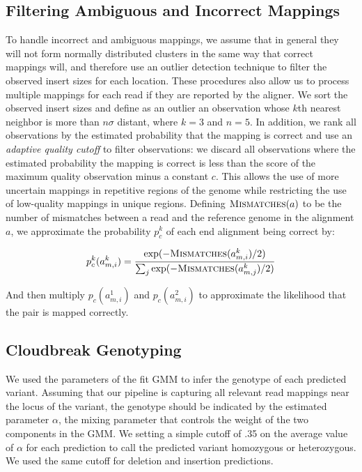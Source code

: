\documentclass[10pt]{bmc_article}
\newenvironment{bmcformat}{\fussy\setboolean{publ}{true}}{\fussy}
\begin{document}
\begin{bmcformat}
\subsection*{Filtering Ambiguous and Incorrect Mappings}
To handle incorrect and ambiguous mappings, we assume that in general they will not form normally distributed clusters in the same way that correct mappings will, and therefore use an outlier detection technique to filter the observed insert sizes for each location. These procedures also allow us to process multiple mappings for each read if they are reported by the aligner. We sort the observed insert sizes and define as an outlier an observation whose $k$th nearest neighbor is more than $n\sigma$ distant, where $k = 3$ and $n = 5$. In addition, we rank all observations by the estimated probability that the mapping is correct and use an \emph{adaptive quality cutoff} to filter observations: we discard all observations where the estimated probability the mapping is correct is less than the score of the maximum quality observation minus a constant $c$. This allows the use of more uncertain mappings in repetitive regions of the genome while restricting the use of low-quality mappings in unique regions. Defining $\textsc{Mismatches}(a)$ to be the number of mismatches between a read and the reference genome in the alignment $a$, we approximate the probability $p^{k}_c$ of each end alignment being correct by:

\[ p^{k}_c(a^{k}_{m,i}) = \frac{\exp({-\textsc{Mismatches}(a^{k}_{m,i})/2)}}{\sum_j{\exp(-\textsc{Mismatches}(a^{k}_{m,j})/2)}} \]

And then multiply $p_c(a^{1}_{m,i})$ and $p_c(a^{2}_{m,i})$ to approximate the likelihood that the pair is mapped correctly.

\subsection*{Cloudbreak Genotyping}
We used the parameters of the fit GMM to infer the genotype of each predicted variant. Assuming that our pipeline is capturing all relevant read mappings near the locus of the variant, the genotype should be indicated by the estimated parameter $\alpha$, the mixing parameter that controls the weight of the two components in the GMM. We setting a simple cutoff of .35 on the average value of $\alpha$ for each prediction to call the predicted variant homozygous or heterozygous. We used the same cutoff for deletion and insertion predictions.


\end{bmcformat}
\end{document}
